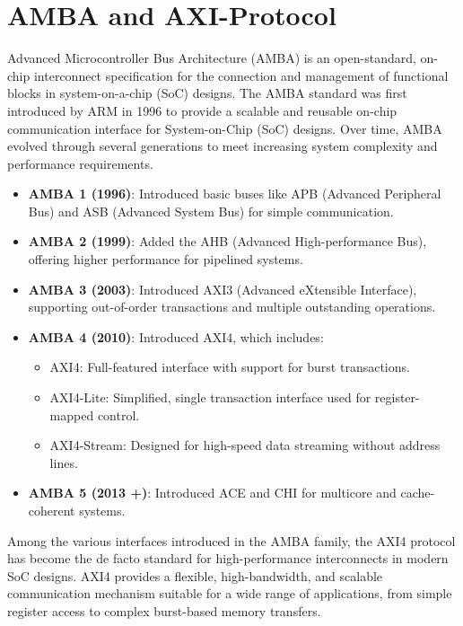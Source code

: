 \section{AMBA and AXI-Protocol}

Advanced Microcontroller Bus Architecture (AMBA) is an open-standard, on-chip interconnect specification for the connection and management of functional blocks in system-on-a-chip (SoC) designs. The AMBA standard was first introduced by ARM in 1996 to provide a scalable and reusable on-chip communication interface for System-on-Chip (SoC) designs. Over time, AMBA evolved through several generations to meet increasing system complexity and performance requirements.\cite{walshe_what_2014}

\begin{itemize}
    \item \textbf{AMBA 1 (1996)}: Introduced basic buses like APB (Advanced Peripheral Bus) and ASB (Advanced System Bus) for simple communication.
    \item \textbf{AMBA 2 (1999)}: Added the AHB (Advanced High-performance Bus), offering higher performance for pipelined systems.
    \item \textbf{AMBA 3 (2003)}: Introduced AXI3 (Advanced eXtensible Interface), supporting out-of-order transactions and multiple outstanding operations.
    \item \textbf{AMBA 4 (2010)}: Introduced AXI4, which includes:
        \begin{itemize}
            \item AXI4: Full-featured interface with support for burst transactions.
            \item AXI4-Lite: Simplified, single transaction interface used for register-mapped control.
            \item AXI4-Stream: Designed for high-speed data streaming without address lines.
        \end{itemize}
    \item \textbf{AMBA 5 (2013 +)}: Introduced \ac{ACE} and \ac{CHI} for multicore and cache-coherent systems.
\end{itemize}

Among the various interfaces introduced in the AMBA family, the \ac{AXI4} protocol has become the de facto standard for high-performance interconnects in modern SoC designs. AXI4 provides a flexible, high-bandwidth, and scalable communication mechanism suitable for a wide range of applications, from simple register access to complex burst-based memory transfers.\cite{aldec_inc_xilinx_2025}


